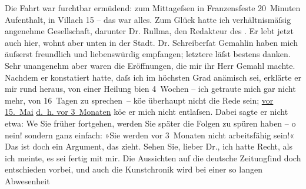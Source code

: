 \begin{ledgroupsized}[t]{13cm}
           Die Fahrt war furchtbar ermüdend: zum Mittageſsen in Franzensfeste 20 Minuten Aufenthalt, in Villach 15 – das war alles. Zum Glück hatte ich verhältnismäſsig angenehme
               Gesellschaft, darunter Dr. Rullma{\geminationn}, den Redakteur des \label{K_L00176_2v}\label{K_L00176_2h}. Er lebt jetzt
               auch hier, wohnt aber unten in der Stadt.\pend
           \pstart
           Dr. Schreiberſa{\geminationm}t Gemahlin haben mich äuſserst freundlich und
               liebenswürdig empfangen; letztere läſst bestens danken. Sehr unangenehm aber waren
               die Eröffnungen, die mir ihr Herr Gemahl machte. Nachdem er konstatiert hatte, daſs ich im höchsten Grad
               anämisch sei, erklärte er mir rund heraus, von einer Heilung bi{\geminationn}en 4 Wochen – ich getraute mich gar nicht mehr, von
               16 Tagen zu sprechen – kö{\geminationn}e überhaupt nicht die Rede
               sein; \uline{vor 15. Mai}{ }{\pb}\uline{d. h. vor 3 Monaten} kö{\geminationn}e
               er mich nicht entlaſsen. Dabei sagte er nicht etwa: We{\geminationn}
               Sie früher fortgehen, werden Sie später die Folgen zu spüren haben – o nein! sondern
               ganz einfach: »Sie werden vor 3 Monaten nicht arbeitsfähig sein!« Das ist doch ein
               Argument, das zieht.\pend
           \pstart
           Sehen Sie, lieber Dr., ich hatte Recht, als ich meinte, es sei fertig mit mir. Die
               Aussichten auf die deutsche Zeitungſind doch entschieden vorbei, und auch die Kunstchronik wird bei einer so langen Abwesenheit

\end{ledgroupsized}
